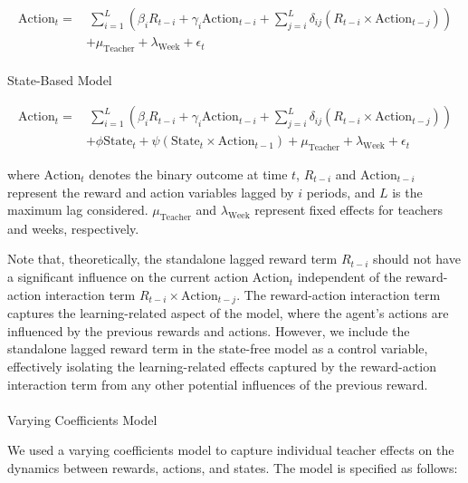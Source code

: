 \documentclass[
  number,
  preprint,
  3p,
  onecolumn]{elsarticle}
\makeatletter
\let\oldparagraph\paragraph
\renewcommand{\paragraph}{
    \@ifstar
      \xxxParagraphStar
      \xxxParagraphNoStar
  }
\newcommand{\xxxParagraphStar}[1]{\oldparagraph*{#1}\mbox{}}
\newcommand{\xxxParagraphNoStar}[1]{\oldparagraph{#1}\mbox{}}
\makeatother
\begin{document}
\begin{align*}
\text{Action}_t =& \ \sum_{i=1}^{L} \left( \beta_{i} R_{t-i} + \gamma_i \text{Action}_{t-i} + \sum_{j=i}^{L} \delta_{ij} (R_{t-i} \times \text{Action}_{t-j}) \right) \\
& + \mu_{\text{Teacher}} + \lambda_{\text{Week}} + \epsilon_t 
\end{align*}

\paragraph{State-Based Model}\label{state-based-model}

\begin{align*}
\text{Action}_t =& \ \sum_{i=1}^{L} \left( \beta_{i} R_{t-i} + \gamma_i \text{Action}_{t-i} + \sum_{j=i}^{L} \delta_{ij} (R_{t-i} \times \text{Action}_{t-j}) \right) \\
& + \phi \text{State}_{t} + \psi (\text{State}_{t} \times \text{Action}_{t-1}) + \mu_{\text{Teacher}} + \lambda_{\text{Week}} + \epsilon_t
\end{align*}

where \(\text{Action}_t\) denotes the binary outcome at time \(t\),
\(R_{t-i}\) and \(\text{Action}_{t-i}\) represent the reward and action
variables lagged by \(i\) periods, and \(L\) is the maximum lag
considered. \(\mu_{\text{Teacher}}\) and \(\lambda_{\text{Week}}\)
represent fixed effects for teachers and weeks, respectively.

Note that, theoretically, the standalone lagged reward term \(R_{ t-i}\)
should not have a significant influence on the current action
\(\text{Action}_t\) independent of the reward-action interaction term
\(R_{t-i} \times \text{Action}_{t-j}\). The reward-action interaction
term captures the learning-related aspect of the model, where the
agent's actions are influenced by the previous rewards and actions.
However, we include the standalone lagged reward term in the state-free
model as a control variable, effectively isolating the learning-related
effects captured by the reward-action interaction term from any other
potential influences of the previous reward.

\paragraph{Varying Coefficients Model}\label{varying-coefficients-model}

We used a varying coefficients model to capture individual teacher
effects on the dynamics between rewards, actions, and states. The model
is specified as follows:
\end{document}
